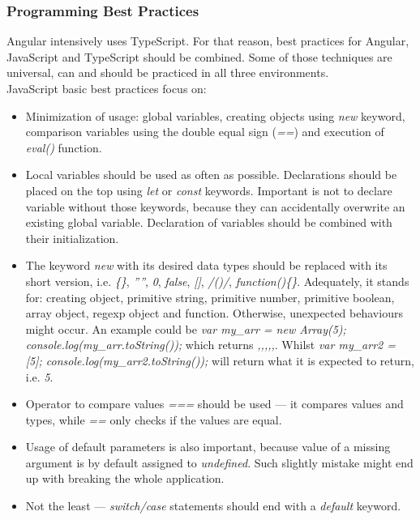 \documentclass{article} %
\begin{document}
\subsubsection{Programming Best Practices}
Angular intensively uses TypeScript. For that reason, best practices for Angular, JavaScript and TypeScript should be combined. Some of those techniques are universal, can and should be practiced in all three environments.\\
\newline
JavaScript basic best practices \cite{bib:js_best_practices} focus on:
\begin{itemize}
    \item Minimization of usage: global variables, creating objects using \textit{new} keyword, comparison variables using the double equal sign (\textit{==}) and execution of \textit{eval()} function.
    \item Local variables should be used as often as possible. Declarations should be placed on the top using \textit{let} or \textit{const} keywords. Important is not to declare variable without those keywords, because they can accidentally overwrite an existing global variable. Declaration of variables should be combined with their initialization.
    \item The keyword \textit{new} with its desired data types should be replaced with its short version, i.e. \textit{\{\}}, \textit{''''}, \textit{0}, \textit{false}, \textit{[]}, \textit{/()/}, \textit{function()\{\}}. Adequately, it stands for: creating object, primitive string, primitive number, primitive boolean, array object, regexp object and function. Otherwise, unexpected behaviours might occur. An example could be \textit{var my\_arr = new Array(5); console.log(my\_arr.toString());} which returns \textit{,,,,,}. Whilst \textit{var my\_arr2 = [5]; console.log(my\_arr2.toString());} will return what it is expected to return, i.e. \textit{5}.
    \item Operator to compare values \textit{===} should be used --- it compares values and types, while \textit{==} only checks if the values are equal.
    \item Usage of default parameters is also important, because value of a missing argument is by default assigned to \textit{undefined}. Such slightly mistake might end up with breaking the whole application.
    \item Not the least --- \textit{switch/case} statements should end with a \textit{default} keyword.
\end{itemize}
\end{document}
